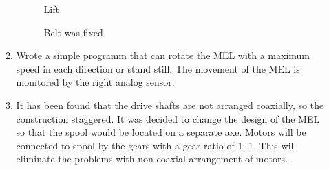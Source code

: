 \begin{enumerate}
\begin{enumerate}
\begin{figure}[H]
\begin{minipage}[h]{0.27\linewidth}
      	\end{minipage}
      	\hfill
      	\begin{minipage}[h]{0.27\linewidth}
      	\end{minipage}
      	\vfill
      	\begin{minipage}[h]{0.4\linewidth}
      		\caption{Lift}
      	\end{minipage}
      	\hfill
      	\begin{minipage}[h]{0.58\linewidth}
      		\caption{Belt was fixed}
      	\end{minipage}
      \end{figure}
      
      \item	Wrote a simple programm that can rotate the MEL with a maximum speed in each direction or stand still. The movement of the MEL is monitored by the right analog sensor.
      
      \item	It has been found that the drive shafts are not arranged coaxially, so the construction staggered. It was decided to change the design of the MEL so that the spool would be located on a separate axe. Motors will be connected to spool by the gears with a gear ratio of 1: 1. This will eliminate the problems with non-coaxial arrangement of motors.
      

\end{enumerate}
\end{enumerate}
